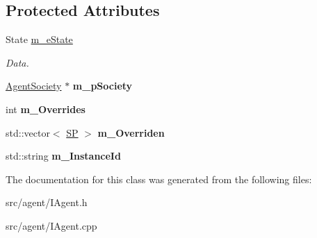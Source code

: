 \subsection*{Protected Attributes}
\begin{DoxyCompactItemize}
\item 
\mbox{\label{class_i_agent_a610556bfbb11adc1900370d200e21486}} 
State \hyperlink{class_i_agent_a610556bfbb11adc1900370d200e21486}{m\+\_\+e\+State}
\begin{DoxyCompactList}\small\item\em Data. \end{DoxyCompactList}\item 
\mbox{\label{class_i_agent_aa518895ac7b3dc7c611285c5c3281e97}} 
\hyperlink{class_agent_society}{Agent\+Society} $\ast$ {\bfseries m\+\_\+p\+Society}
\item 
\mbox{\label{class_i_agent_a44af3f5b1c4a9828d1f3840f83064a21}} 
int {\bfseries m\+\_\+\+Overrides}
\item 
\mbox{\label{class_i_agent_ae206f22cf4d1a734a01e648384485e7e}} 
std\+::vector$<$ \hyperlink{class_i_agent_a9e88f0528d282c33200a2d43d1c29a73}{SP} $>$ {\bfseries m\+\_\+\+Overriden}
\item 
\mbox{\label{class_i_agent_a06fcde1be1039cffd81d63f3112766e4}} 
std\+::string {\bfseries m\+\_\+\+Instance\+Id}
\end{DoxyCompactItemize}


The documentation for this class was generated from the following files\+:\begin{DoxyCompactItemize}
\item 
src/agent/I\+Agent.\+h\item 
src/agent/I\+Agent.\+cpp\end{DoxyCompactItemize}
